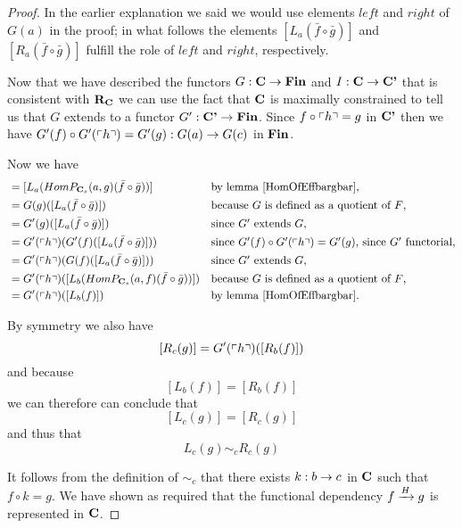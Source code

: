 \begin{proof}
In the earlier explanation we said we would use elements $left$ and $right$ of $G(a)$
in the proof; in what follows
the elements
$[L_a(\bar{f}\circ \bar{g})]$ and $[R_a(\bar{f}\circ \bar{g})]$ fulfill the role of $left$ and $right$, respectively.

Now that we have described the functors  $G: \catc \morph \Fin$ and $I:\catc \morph \catcp$ that is consistent with $\reqtc$
we can use the fact that $\catc$ is maximally constrained to tell us that $G$ extends to a functor 
$G' : \catcp \morph \Fin$. Since $f \circ \qq{h} = g$ in $\catcp$ then we have
 $G'(f) \circ G'(\qq{h}) = G'(g): G(a) \morph G(c)$ in $\Fin$.

Now we have
\begin{align*}
[L_c(g)] &= [L_a(HomP_{\catc_s}(a,g)(\bar{f}\circ \bar{g}))] 
                && \mbox{by lemma \ref{HomOfEffbargbar},}\\
        &= G(g)([L_a(\bar{f}\circ \bar{g})])       
                && \mbox{because $G$ is defined as a quotient of $F$,}\\
        &= G'(g)([L_a(\bar{f}\circ \bar{g})])      
                && \mbox{since $G'$ extends $G$,} \\
        &= G'(\qq{h}) (G'(f)([L_a(\bar{f}\circ \bar{g})])) 
                && \mbox{since $G'(f) \circ G'(\qq{h}) = G'(g)$, since $G'$ functorial,}\\
        &= G'(\qq{h}) (G(f)([L_a(\bar{f}\circ \bar{g})])) 
                && \mbox{since $G'$ extends $G$,}          \\ 
        &= G'(\qq{h})([L_b(HomP_{\catc_s}(a,f)(\bar{f}\circ \bar{g}))])
                && \mbox{because $G$ is defined as a quotient of $F$,} \\
	      &= G'(\qq{h}) ([L_b(f)])       
                &&\mbox{by lemma \ref{HomOfEffbargbar}.} \\
\end{align*}

By symmetry we also have
$$[R_c(g)] = G'(\qq{h}) ([R_b(f)])  $$
and because
$$[L_b(f)]=[R_b(f)]$$
we can therefore can conclude that
$$[L_c(g)] = [R_c(g)]$$
and thus that
$$ L_c(g) \sim_c R_c(g)$$

It follows from the definition of $\sim_c$ that there exists $k:b \morph c$ in 
$\catc$ such that $f \circ k = g$.  
We have shown as required that the functional dependency
$\fundep{H}{f}{g}$ is represented in $\catc$.
\end{proof}
